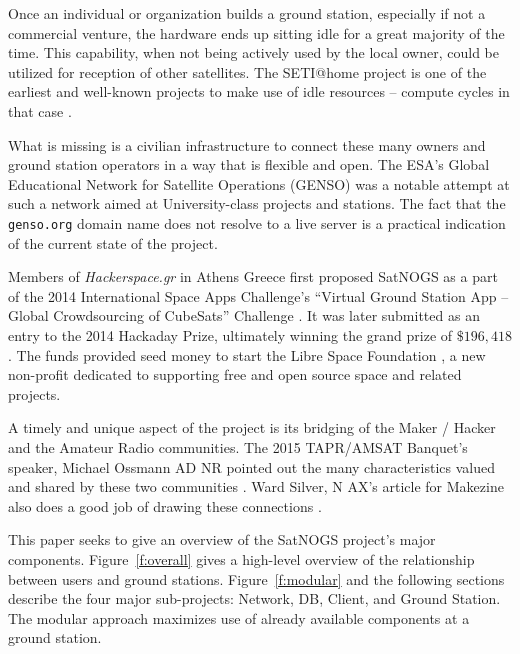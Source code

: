 \documentclass[conference,letterpaper,12pt]{IEEEtran}
\newcommand{\figref}[1]{Figure~\ref{#1}}
\newcommand*{\pmzeroslash}{%
    \sbox0{0}%
    \sbox2{/}%
    \sbox4{%
      \raise\dimexpr((\ht0-\dp0)-(\ht2-\dp2))/2\relax\copy2 %
    }%
    \ooalign{%
      \hfill\copy4 \hfill\cr
      \hfill0\hfill\cr
    }%
    \vphantom{0\copy4 }%
}
\begin{document}
Once an individual or organization builds a ground station, especially if not a commercial venture, the hardware ends up sitting idle for a great majority of the time.
This capability, when not being actively used by the local owner, could be utilized for reception of other satellites.
The SETI@home project is one of the earliest and well-known projects to make use of idle resources -- compute cycles in that case \cite{SETI@home}.

What is missing is a civilian infrastructure to connect these many owners and ground station operators in a way that is flexible and open.
The ESA's Global Educational Network for Satellite Operations (GENSO) \cite{GENSO} was a notable attempt at such a network aimed at University-class projects and stations.
The fact that the \verb|genso.org| domain name does not resolve to a live server is a practical indication of the current state of the project.

Members of \emph{Hackerspace.gr} \cite{Hackerspacegr} in Athens Greece first proposed SatNOGS as a part of the 2014 International Space Apps Challenge's ``Virtual Ground Station App -- Global Crowdsourcing of CubeSats'' Challenge \cite{SpaceAppsChallenge2014-SatNOGS}.
It was later submitted as an entry to the 2014 Hackaday Prize, ultimately winning the grand prize of $\$196,418$ \cite{HackadayPrize2014}.
The funds provided seed money to start the Libre Space Foundation \cite{LibreSpaceFoundation}, a new non-profit dedicated to supporting free and open source space and related projects.

A timely and unique aspect of the project is its bridging of the Maker / Hacker and the Amateur Radio communities.
The 2015 TAPR/AMSAT Banquet's speaker, Michael Ossmann AD\pmzeroslash NR pointed out the many characteristics valued and shared by these two communities \cite{HamRadioNow211}.
Ward Silver, N\pmzeroslash AX's article for Makezine also does a good job of drawing these connections \cite{Silver2015}.


This paper seeks to give an overview of the SatNOGS project's major components.
\figref{f:overall} gives a high-level overview of the relationship between users and ground stations.
\figref{f:modular} and the following sections describe the four major sub-projects: Network, DB, Client, and Ground Station.
The modular approach maximizes use of already available components at a ground station.
\end{document}
